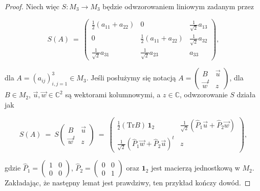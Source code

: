{\begin{proof}
Niech więc $S\!: M_{3} \rightarrow M_{3}$ będzie odwzorowaniem liniowym
zadanym przez
\begin{linenomath*}
 \begin{equation}
\label{eq:DefinitionOfS}
S(A) \:=\: \begin{pmatrix}
        \frac{1}{2}(a_{11} + a_{22}) & 0 & \frac{1}{\sqrt{2}} a_{13} \\
        0 & \frac{1}{2}(a_{11} + a_{22}) & \frac{1}{\sqrt{2}} a_{32} \\
        \frac{1}{\sqrt{2}} a_{31} & \frac{1}{\sqrt{2}} a_{23} & a_{33}
        \end{pmatrix},
 \end{equation}
\end{linenomath*}
dla
$A = \left( a_{ij} \right)_{i,j=1}^{3}
        \in M_{3}$.
Jeśli posłużymy się notacją
$A = \left( \begin{smallmatrix}
    B & \vec{u} \\
    \vec{w}^{t} & z
    \end{smallmatrix} \right)$,
dla $B \in M_{2}$,
$\vec{u},\vec{w} \in \mathbb{C}^{2}$ są wektorami kolumnowymi,
a $z \in \mathbb{C}$,
odwzorowanie $S$ działa jak
\begin{linenomath*}
 \begin{equation}
    S(A) \:=\: S \begin{pmatrix}
    B & \vec{u} \\
    \vec{w}^{t} & z
    \end{pmatrix} \: = \:
    \begin{pmatrix}
        \frac{1}{2} (\text{Tr} B) \, \mathbf{1}_{2} &
            \frac{1}{\sqrt{2}}(\hat{P}_{1} \vec{u} + \hat{P}_{2} \vec{w}) \\
        \frac{1}{\sqrt{2}}(\hat{P}_{1} \vec{w} + \hat{P}_{2} \vec{u})^{t} & z
    \end{pmatrix},
 \end{equation}
\end{linenomath*}
gdzie
$\hat{P}_{1} = \left( \begin{smallmatrix} 1 & 0 \\ 0 & 0 \end{smallmatrix} \right)$,
$\hat{P}_{2} = \left( \begin{smallmatrix} 0 & 0 \\ 0 & 1 \end{smallmatrix} \right)$
oraz $\mathbf{1}_{2}$ jest macierzą jednostkową w $M_{2}$.
Zakładając, że następny lemat jest prawdziwy,
ten przykład kończy dowód.
\end{proof}

}
